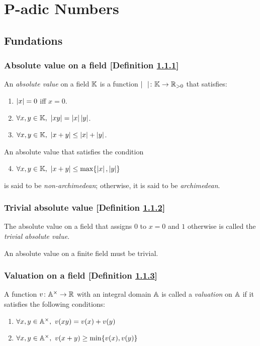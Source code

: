\section{P-adic Numbers}
\subsection{Fundations}
\subsubsection{Absolute value on a field [Definition \ref{absolute-value-on-a-field}]}\label{absolute-value-on-a-field}
An \textit{absolute value} on a field $\mathbb{K}$ is a function $\mid \ \ \mid \colon \mathbb{K} \to \mathbb{R}_{>0}$ that satisfies:
\begin{enumerate}[label=\roman*)]
\item $\left| x \right| = 0$ iff $x = 0$.
\item $\forall x, y \in \mathbb{K},\ \left| xy \right| = \left| x \right|\left| y \right|$.
\item $\forall x, y \in \mathbb{K},\ \left| x+y \right| \le \left| x \right|+\left| y \right|$.
\end{enumerate}

An absolute value that satisfies the condition
\begin{enumerate}[label=\roman*)]
\setcounter{enumi}{3}
\item $\forall x, y \in \mathbb{K},\ \left| x+y \right| \le \max \{ \left| x \right|,\left| y \right| \}$
\end{enumerate}
is said to be \textit{non-archimedean}; otherwise, it is said to be \textit{archimedean}.

\subsubsection{Trivial absolute value [Definition \ref{trivial-absolute-value}]}\label{trivial-absolute-value}
The absolute value on a field that assigns 0 to $x = 0$ and $1$ otherwise is called the \textit{trivial absolute value}.

An absolute value on a finite field must be trivial.

\subsubsection{Valuation on a field [Definition \ref{valuation-on-a-field}]}\label{valuation-on-a-field}
A function $v \colon \mathbb{A}^\times \to \mathbb{R}$ with an integral domain $\mathbb{A}$ is called a \textit{valuation} on $\mathbb{A}$ if it satisfies the following conditions:
\begin{enumerate}[label=\roman*)]
\item $\forall x, y \in \mathbb{A}^\times,\ v(xy) = v(x) + v(y)$
\item $\forall x, y \in \bb{A}^\times,\ v(x+y) \ge \min \{ v(x), v(y) \}$
\end{enumerate}

